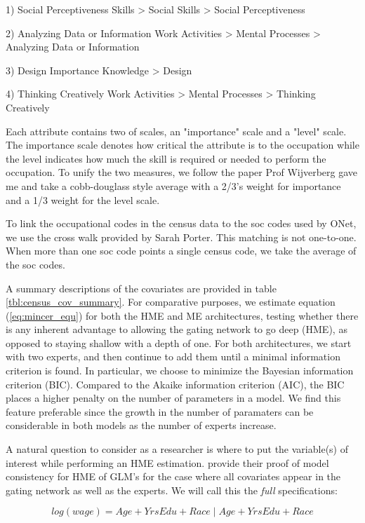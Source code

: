 \documentclass[12pt]{article}
\begin{document}
1) Social Perceptiveness
   Skills > Social Skills > Social Perceptiveness
   
2) Analyzing Data or Information
   Work Activities > Mental Processes > Analyzing Data or Information

3) Design Importance
    Knowledge > Design

4) Thinking Creatively
   Work Activities > Mental Processes > Thinking Creatively

Each attribute contains two of scales, an "importance" scale and a
"level" scale. The importance scale denotes how critical the attribute
is to the occupation while the level indicates how much the skill is
required or needed to perform the occupation. To unify the two
measures, we follow the paper Prof Wijverberg gave me and take a
cobb-douglass style average with a 2/3's weight for importance and a 1/3
weight for the level scale.

To link the occupational codes in the census data to the soc codes used
by ONet, we use the cross walk provided by Sarah Porter. This matching
is not one-to-one. When more than one soc code points a single census
code, we take the average of the soc codes.

A summary descriptions of the covariates are provided in table
\ref{tbl:census_cov_summary}. For comparative purposes, we estimate equation
(\ref{eq:mincer_equ}) for both the HME and ME architectures, testing whether
there is any inherent advantage to allowing the gating network to go deep
(HME), as opposed to staying shallow with a depth of one. For both
architectures, we start with two experts, and then continue to add them until
a minimal information criterion is found. In particular, we choose to minimize
the Bayesian information criterion (BIC). Compared to the Akaike information
criterion (AIC), the BIC places a higher penalty on the number of parameters
in a model. We find this feature preferable since the growth in the number
of paramaters can be considerable in both models as the number of experts
increase.

A natural question to consider as a researcher is where to put the variable(s)
of interest while performing an HME estimation. \cite{JiangTanner2000}
provide their proof of model consistency for HME of GLM's for the case where
all covariates appear in the gating network as well as the experts. We will
call this the \textit{full} specifications:

\begin{equation}
  log(wage) = Age + YrsEdu + Race \; | \; Age + YrsEdu + Race
\end{equation}
\end{document}
